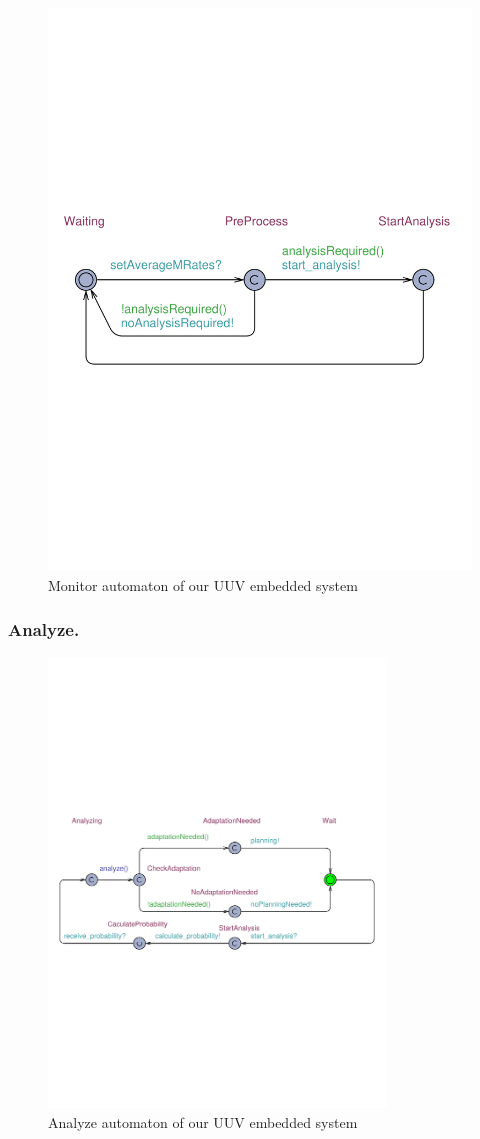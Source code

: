 \begin{figure}[h!]
	\centering
	\includegraphics[trim = 10mm 100mm 0mm 125mm, clip, width=0.5\linewidth]{figures/Monitor.pdf}
	\caption{Monitor automaton of our UUV embedded system}\label{fig:monitor-automaton}
	
	\vspace*{-2mm}
\end{figure}

\subsubsection{Analyze.}

\begin{figure}[b]
	\centering
	\includegraphics[trim = 5mm 95mm 0mm 105mm, clip, width=0.8\textwidth]{figures/Analyzer}
	\caption{Analyze automaton of our UUV embedded system}\label{fig:analysis-automaton}
	
	\vspace*{-2mm}
\end{figure}

